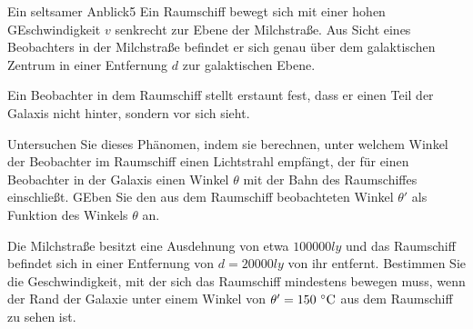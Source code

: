 \begin{problem}{Ein seltsamer Anblick}{5}
Ein Raumschiff bewegt sich mit einer hohen GEschwindigkeit $v$ senkrecht zur Ebene der Milchstraße.  Aus Sicht eines Beobachters in der Milchstraße befindet er sich genau über dem galaktischen Zentrum in einer Entfernung $d$ zur galaktischen Ebene.

Ein Beobachter in dem Raumschiff stellt erstaunt fest, dass er einen Teil der Galaxis nicht hinter, sondern vor sich sieht.
\begin{abcenum}
 \item Untersuchen Sie dieses Phänomen, indem sie berechnen, unter welchem Winkel der Beobachter im Raumschiff einen Lichtstrahl empfängt, der für einen Beobachter in der Galaxis einen Winkel $\theta$ mit der Bahn des Raumschiffes einschließt.  GEben Sie den aus dem Raumschiff beobachteten Winkel $\theta'$ als Funktion des Winkels $\theta$ an.
 \item Die Milchstraße besitzt eine Ausdehnung von etwa $100000\unit{ly}$ und das Raumschiff befindet sich in einer Entfernung von $d=20000\unit{ly}$ von ihr entfernt.  Bestimmen Sie die Geschwindigkeit, mit der sich das Raumschiff mindestens bewegen muss, wenn der Rand der Galaxie unter einem Winkel von $\theta'=150\,\mathrm{\,^\circ\mathrm{C}}$ aus dem Raumschiff zu sehen ist.
\end{abcenum}
\end{problem}


